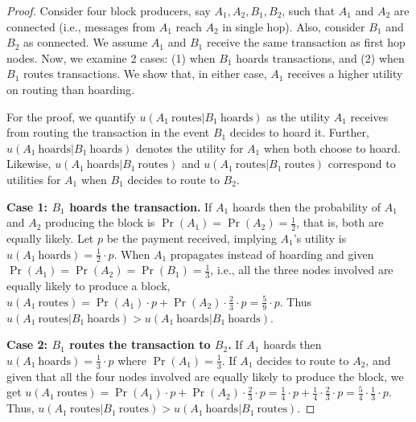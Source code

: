 \begin{proof}

    Consider four block producers, say $A_{1}, A_{2}, B_{1}, B_{2}$, such that $A_{1}$ and $A_{2}$ are connected (i.e., messages from $A_{1}$ reach $A_{2}$ in single hop). Also, consider $B_{1}$ and $B_{2}$ as connected. We assume $A_1$ and $B_1$ receive the same transaction as first hop nodes. Now, we examine 2 cases: (1) when $B_{1}$ hoards transactions, and (2) when $B_{1}$ routes transactions. We show that, in either case, $A_{1}$ receives a higher utility on routing than hoarding.
    
    For the proof, we quantify $u(A_1\ \mbox{routes} | B_1\ \mbox{hoards})$ as the utility $A_1$ receives from routing the transaction in the event $B_1$ decides to hoard it. Further, $u(A_1\ \mbox{hoards} | B_1\ \mbox{hoards})$ denotes the utility for $A_1$ when both choose to hoard. Likewise, $u(A_1\ \mbox{hoards} | B_1\ \mbox{routes})$ and $u(A_1\ \mbox{routes} | B_1\ \mbox{routes})$ correspond to utilities for $A_1$  when $B_1$ decides to route to $B_2$.
    \smallskip

    \noindent \textbf{Case 1: $B_1$ hoards the transaction.} If $A_1$ hoards then the probability of $A_1$ and $A_2$ producing the block is $\Pr(A_1) = \Pr(A_2) = \frac{1}{2}$, that is, both are equally likely. Let $p$ be the payment received, implying $A_1$'s utility is $u(A_1\ \mbox{hoards}) = \frac{1}{2}\cdot p$. When $A_1$ propagates instead of hoarding and given $\Pr(A_1) = \Pr(A_2) = \Pr(B_1) = \frac{1}{3}$, i.e., all the three nodes involved are equally likely to produce a block, $u(A_1 \ \mbox{routes}) = \Pr(A_1) \cdot p + \Pr(A_2) \cdot \frac{2}{3} \cdot p = \frac{5}{9} \cdot p $. Thus $u(A_1\ \mbox{routes} | B_1\ \mbox{hoards}) > u(A_1\ \mbox{hoards} | B_1\ \mbox{hoards})$.

   \smallskip
    \noindent \textbf{Case 2: $B_1$ routes the transaction to $B_2$.} If $A_1$ hoards then $u(A_1\ \mbox{hoards}) = \frac{1}{3} \cdot p$ where $\Pr(A_1) = \frac{1}{3}$. If $A_1$ decides to route to $A_2$, and given that all the four nodes involved are equally likely to produce the block, we get  $u(A_1\ \mbox{routes}) = \Pr(A_1) \cdot p + \Pr(A_2) \cdot \frac{2}{3} \cdot p  = \frac{1}{4} \cdot p + \frac{1}{4} \cdot \frac{2}{3} \cdot p = \frac{5}{4} \cdot \frac{1}{3} \cdot p$. Thus, $u(A_1\ \mbox{routes} | B_1\ \mbox{routes}) > u(A_1\ \mbox{hoards} | B_1\ \mbox{routes})$.
\end{proof}

